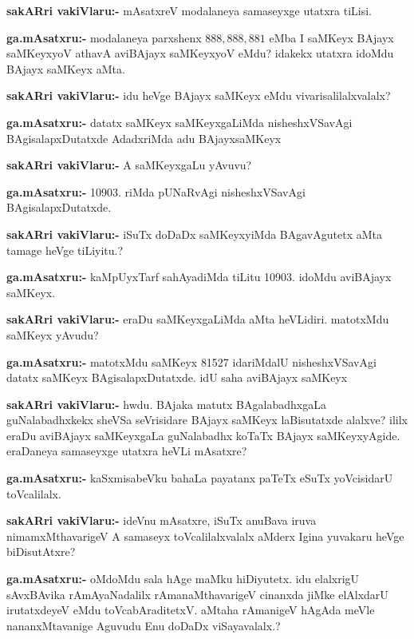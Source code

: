 \smallskip
\noindent
\textbf{sakARri vakiVlaru:-} mAsatxreV modalaneya samaseyxge utatxra tiLisi.

\smallskip
\noindent
\textbf{ga.mAsatxru:-} modalaneya parxshenx $888, 888, 881$ eMba I saMKeyx BAjayx saMKeyxyoV athavA aviBAjayx saMKeyxyoV eMdu? idakekx utatxra idoMdu BAjayx saMKeyx aMta.

\smallskip
\noindent
\textbf{sakARri vakiVlaru:-} idu heVge BAjayx saMKeyx eMdu vivarisalilalxvalalx?

\smallskip
\noindent
\textbf{ga.mAsatxru:-} datatx saMKeyx saMKeyxgaLiMda nisheshxVSavAgi BAgisalapxDutatxde AdadxriMda adu BAjayxsaMKeyx

\smallskip
\noindent
\textbf{sakARri vakiVlaru:-} A saMKeyxgaLu yAvuvu?

\smallskip
\noindent
\textbf{ga.mAsatxru:-} {\rm 10903.} riMda pUNaRvAgi nisheshxVSavAgi BAgisalapxDutatxde.

\smallskip
\noindent
\textbf{sakARri vakiVlaru:-} iSuTx doDaDx saMKeyxyiMda BAgavAgutetx aMta tamage heVge tiLiyitu.?

\smallskip
\noindent
\textbf{ga.mAsatxru:-} kaMpUyxTarf sahAyadiMda tiLitu {\rm 10903.} idoMdu aviBAjayx saMKeyx.

\smallskip
\noindent
\textbf{sakARri vakiVlaru:-} eraDu saMKeyxgaLiMda aMta heVLidiri. matotxMdu saMKeyx yAvudu?

\smallskip
\noindent
\textbf{ga.mAsatxru:-} matotxMdu saMKeyx {\rm 81527} idariMdalU nisheshxVSavAgi datatx saMKeyx BAgisalapxDutatxde. idU saha aviBAjayx saMKeyx

\smallskip
\noindent
\textbf{sakARri vakiVlaru:-} hwdu. BAjaka matutx BAgalabadhxgaLa guNalabadhxkekx sheVSa seVrisidare BAjayx saMKeyx laBisutatxde alalxve? ililx eraDu aviBAjayx saMKeyxgaLa guNalabadhx koTaTx BAjayx saMKeyxyAgide. eraDaneya samaseyxge utatxra heVLi mAsatxre?

\smallskip
\noindent
\textbf{ga.mAsatxru:-} kaSxmisabeVku bahaLa payatanx paTeTx eSuTx yoVcisidarU toVcalilalx.

\smallskip
\noindent
\textbf{sakARri vakiVlaru:-} ideVnu mAsatxre, iSuTx anuBava iruva nimamxMthavarigeV A samaseyx toVcalilalxvalalx aMderx Igina yuvakaru heVge biDisutAtxre?

\smallskip
\noindent
\textbf{ga.mAsatxru:-} oMdoMdu sala hAge maMku hiDiyutetx. idu elalxrigU sAvxBAvika rAmAyaNadalilx rAmanaMthavarigeV cinanxda jiMke elAlxdarU irutatxdeyeV eMdu toVcabAraditetxV. aMtaha rAmanigeV hAgAda meVle nananxMtavanige Aguvudu Enu doDaDx viSayavalalx.?

